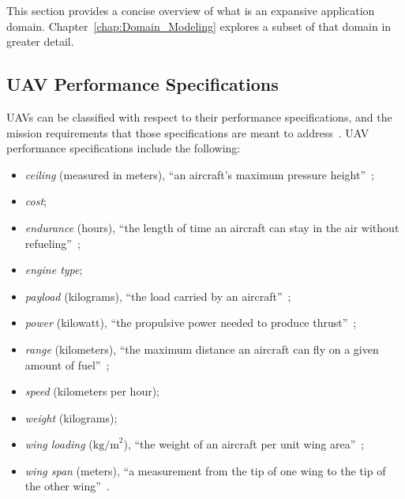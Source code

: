 This section provides a concise overview of what is an expansive application domain. Chapter~\ref{chap:Domain_Modeling} explores a subset of that domain in greater detail.

\subsection{UAV Performance Specifications}
\label{sec:UAV_Performance_Specifications}

UAVs can be classified with respect to their performance specifications, and the mission requirements that those specifications are meant to address~\cite{Arjomandi}. UAV performance specifications include the following:

\begin{itemize}

\item \emph{ceiling} (measured in meters), ``an aircraft's maximum pressure height''~\cite{Crocker_2007};

\item \emph{cost};

\item \emph{endurance} (hours), ``the length of time an aircraft can stay in the air without refueling''~\cite{Crocker_2007};

\item \emph{engine type};

\item \emph{payload} (kilograms), ``the load carried by an aircraft''~\cite{Crocker_2007};

\item \emph{power} (kilowatt), ``the propulsive power needed to produce thrust''~\cite{Crocker_2007};

\item \emph{range} (kilometers), ``the maximum distance an aircraft can fly on a given amount of fuel''~\cite{Crocker_2007};

\item \emph{speed} (kilometers per hour);

\item \emph{weight} (kilograms);

\item \emph{wing loading} ($\textrm{kg/m}^2$), ``the weight of an aircraft per unit wing area''~\cite{Crocker_2007};

\item \emph{wing span} (meters), ``a measurement from the tip of one wing to the tip of the other wing''~\cite{Crocker_2007}.

\end{itemize}

